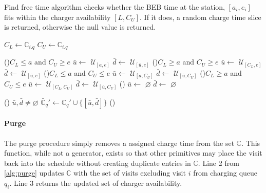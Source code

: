 \documentclass[11pt,a4paper,final]{article}
\newcommand{\C}{\mathbb{C}}                 %
\newcommand{\U}{\mathcal{U}}                %
\begin{document}
\begin{algorithm}[H]
\scriptsize
\caption{Find free time algorithm checks whether the BEB time at the station, $[a_i, e_i]$ fits within the charger availability $[L,C_U]$. If it does, a random charge time slice is returned, otherwise the null value is returned.}
\label{alg:find-free-time}
    \LinesNumbered
    \KwIn{$(\C, i, q, a, e)$}
    \KwOut{($\bar{\C}, \bar{u}, \bar{d})$}

    \Begin
    { 
      $C_L \leftarrow \C_{i.q}$\;
      $C_U \leftarrow \C_{i.q}$\;

      \If(){$C_L \leq a$ and $C_U \geq e$}
      {
        $\bar{u}\leftarrow$ $\U_{[a,e]}$\;
        $\bar{d}\leftarrow$ $\U_{[\bar{u},e]}$\;
      }
      \ElseIf(){$C_L \ge a$ and $C_U \geq e$}
      {
        $\bar{u}\leftarrow$ $\U_{[C_L,e]}$\;
        $\bar{d}\leftarrow$ $\U_{[\bar{u},e]}$\;
      }
      \ElseIf(){$C_L \leq a$ and $C_U \le e$}
      {
        $\bar{u}\leftarrow$ $\U_{[a,C_U]}$\;
        $\bar{d}\leftarrow$ $\U_{[\bar{u},C_U]}$\;
      }
      \ElseIf(){$C_L \ge a$ and $C_U \le e$}
      {
        $\bar{u}\leftarrow$ $\U_{[C_L,C_U]}$\;
        $\bar{d}\leftarrow$ $\U_{[\bar{u},C_U]}$\;
      }
      \Else()
      {
        $\bar{u}\leftarrow$ $\varnothing$\;
        $\bar{d}\leftarrow$ $\varnothing$\;
      }

      \If () {$\bar{u},\bar{d} \ne \varnothing$}
      {
        $\bar{\C}_q' \leftarrow \C_q' \cup \{[\bar{u},\bar{d}]\}$
      }
      \Else()
      {
      }
    }
\end{algorithm}

\paragraph{Purge}
\label{sec:purge}
The purge procedure simply removes a assigned charge time from the set \(\C\). This function, while not a generator,
exists so that other primitives may place the visit back into the schedule without creating duplicate entries in \(\C\).
Line 2 from \ref{alg:purge} updates \(\C\) with the set of visits excluding visit \(i\) from charging queue \(q_i\). Line 3
returns the updated set of charger availability.
\end{document}
